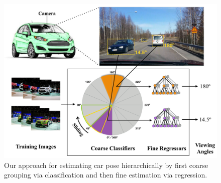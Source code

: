 \documentclass{tutmscthesis}[2010/09/22]
\numberwithin{equation}{section}
\numberwithin{table}{section}
\numberwithin{figure}{section}
\begin{document}
\begin{figure}[t]
\centering
\includegraphics[width=0.98\linewidth]{figure.png}
\caption{Our approach for estimating car pose hierarchically by first coarse grouping via classification and then fine estimation via regression.}
\label{Fig:pipeline} %
\end{figure}
\clearpage
%
\end{document}
